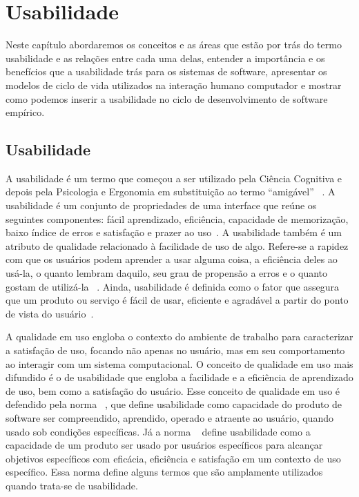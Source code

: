 \chapter{Usabilidade}

Neste capítulo abordaremos os conceitos e as áreas que estão por trás do termo usabilidade e as relações entre cada uma delas, entender a importância e os benefícios que a usabilidade trás para os sistemas de software, apresentar os modelos de ciclo de vida utilizados na interação humano computador e mostrar como podemos inserir a usabilidade no ciclo de desenvolvimento de software empírico.

\section {Usabilidade}

A usabilidade é um termo que começou a ser utilizado pela Ciência Cognitiva e depois pela Psicologia e Ergonomia em substituição ao termo ``amigável'' ~\cite{dias2006}.
% 
A usabilidade é um conjunto de propriedades de uma interface que reúne os seguintes componentes: fácil aprendizado, eficiência, capacidade de memorização, baixo índice de erros e satisfação e prazer ao uso~\cite{nielsen1994}.
%
A usabilidade também é um atributo de qualidade relacionado à facilidade de uso de algo. Refere-se a rapidez com que os usuários podem aprender a usar alguma coisa, a eficiência deles ao usá-la, o quanto lembram daquilo, seu grau de propensão a erros e o quanto gostam de utilizá-la ~\cite{nielsen2007}. 
%
Ainda, usabilidade é definida como o fator que assegura que um produto ou serviço é fácil de usar, eficiente e agradável a partir do ponto de vista do usuário~\cite{preece2007}.


A qualidade em uso engloba o contexto do ambiente de trabalho para caracterizar a satisfação de uso, focando não apenas no usuário, mas em seu comportamento ao interagir com um sistema computacional.
%
O conceito de qualidade em uso mais difundido é o de usabilidade que engloba a facilidade e a eficiência de aprendizado de uso, bem como a satisfação do usuário.
%
Esse conceito de qualidade em uso é defendido pela norma ~, que define usabilidade como  capacidade do produto de software ser compreendido, aprendido, operado e atraente ao usuário, quando usado sob condições específicas.
%
Já a norma ~ define usabilidade como a capacidade de um produto ser usado por usuários específicos para alcançar objetivos específicos com eficácia, eficiência e satisfação em um contexto de uso específico. Essa norma define alguns termos que são amplamente utilizados quando trata-se de usabilidade.

